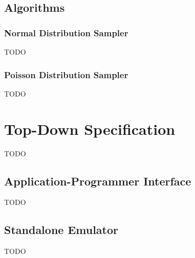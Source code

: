 \subsection{Algorithms}

\subsubsection{Normal Distribution Sampler}

TODO

\subsubsection{Poisson Distribution Sampler}

TODO


\section{Top-Down Specification}

TODO

\subsection{Application-Programmer Interface}

TODO

\subsection{Standalone Emulator}

TODO
